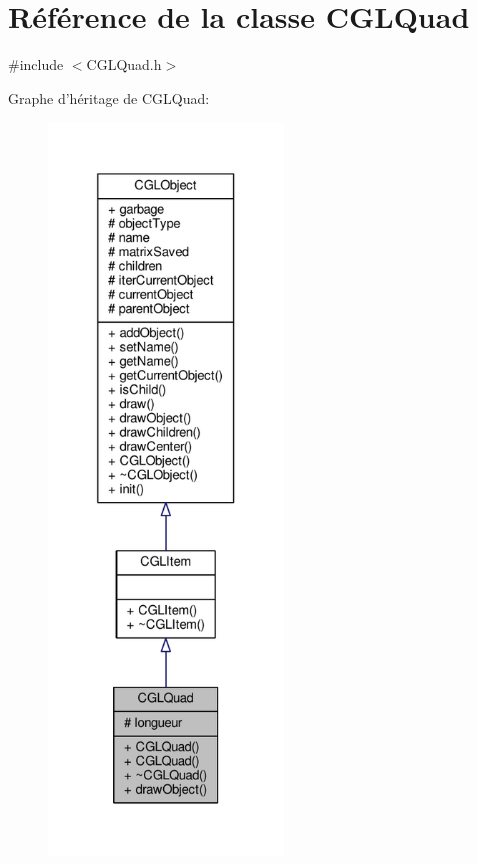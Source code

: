 \hypertarget{class_c_g_l_quad}{\section{Référence de la classe C\-G\-L\-Quad}
\label{class_c_g_l_quad}
}


{\ttfamily \#include $<$C\-G\-L\-Quad.\-h$>$}



Graphe d'héritage de C\-G\-L\-Quad\-:\nopagebreak
\begin{figure}[H]
\begin{center}
\leavevmode
\includegraphics[height=550pt]{d8/de4/class_c_g_l_quad__inherit__graph}
\end{center}
\end{figure}


